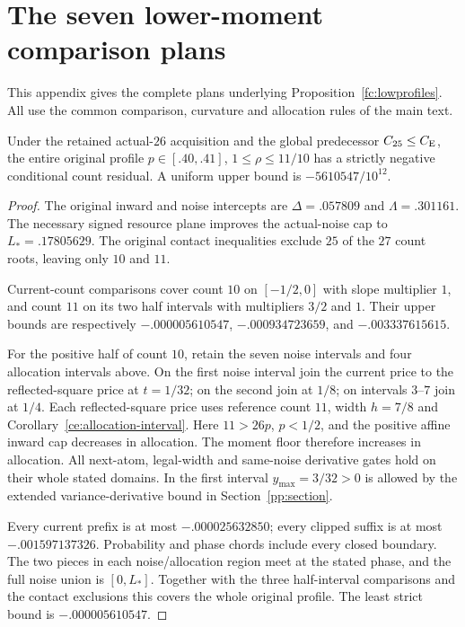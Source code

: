 \section{The seven lower-moment comparison plans}\label{app:finite-details}

This appendix gives the complete plans underlying Proposition~\ref{fc:lowprofiles}.
All use the common comparison, curvature and allocation rules of the main text.

\begin{lemma}\label{fc:low40}
Under the retained actual-$26$ acquisition and the global predecessor
$C_{25}\le C_{\mathrm E}$, the entire original profile
$p\in[.40,.41]$, $1\le\rho\le11/10$ has a strictly negative
conditional count residual. A uniform upper bound is
$-5610547/10^{12}$.
\end{lemma}
\begin{proof}
The original inward and noise intercepts are
$\Delta=.057809$ and $\Lambda=.301161$.
The necessary signed resource plane improves the actual-noise cap
to $L_*=.17805629$. The original contact inequalities exclude
$25$ of the $27$ count roots, leaving only $10$ and $11$.

Current-count comparisons cover count $10$ on $[-1/2,0]$ with
slope multiplier $1$, and count $11$ on its two half intervals
with multipliers $3/2$ and $1$. Their upper bounds are respectively
$-.000005610547$, $-.000934723659$, and $-.003337615615$.

For the positive half of count $10$, retain the seven noise
intervals and four allocation intervals above.
On the first noise interval join the current price to the
reflected-square price at $t=1/32$; on the second join at
$1/8$; on intervals $3$--$7$ join at $1/4$.
Each reflected-square price uses reference count $11$, width
$h=7/8$ and Corollary~\ref{ce:allocation-interval}.
Here $11>26p$, $p<1/2$, and the positive affine inward cap
decreases in allocation. The moment floor therefore increases
in allocation. All next-atom, legal-width and same-noise derivative
gates hold on their whole stated domains. In the first interval
$y_{\max}=3/32>0$ is allowed by the extended variance-derivative
bound in Section~\ref{pp:section}.

Every current prefix is at most $-.000025632850$;
every clipped suffix is at most $-.001597137326$.
Probability and phase chords include every closed boundary.
The two pieces in each noise/allocation region meet at the stated
phase, and the full noise union is $[0,L_*]$.
Together with the three half-interval comparisons and the contact
exclusions this covers the whole original profile. The least strict
bound is $-.000005610547$.
\end{proof}

